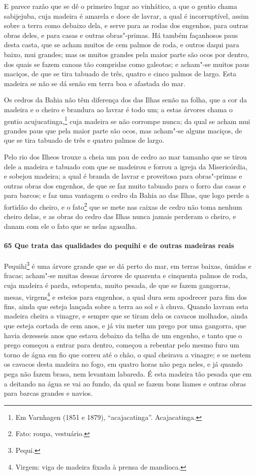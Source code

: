 \begin{linenumbers}
E parece razão que se dê o primeiro lugar ao vinhático, a que o gentio chama sabijejuba,
cuja madeira é amarela e doce de lavrar, a qual é incorruptível, assim sobre a terra como
debaixo dela, e serve para as rodas dos engenhos, para outras obras deles, e para casas e
outras obras"-primas. Há também façanhosos paus desta casta, que se acham muitos de cem
palmos de roda, e outros daqui para baixo, mui grandes; mas os muitos grandes pela maior
parte são ocos por dentro, dos quais se fazem canoas tão compridas
como galeotas; e acham"-se muitos paus maciços, de que se tira tabuado de três, quatro e
cinco palmos de largo. Esta madeira se não se dá senão em terra boa e afastada do mar.


Os cedros da Bahia não têm diferença dos das Ilhas senão na folha, que a cor da madeira e
o cheiro e brandura ao lavrar é todo um; a estas árvores chama o gentio
acujucatinga,\footnote{ Em Varnhagen (1851 e 1879), ``acajacatinga''. Acajacatinga.} cuja
madeira se não corrompe nunca; da qual se acham mui grandes paus que pela maior parte são
ocos, mas acham"-se alguns maciços, de que se tira tabuado de três e quatro palmos de
largo.

Pelo rio dos Ilheos trouxe a cheia um pau de cedro ao mar tamanho que se tirou dele a
madeira e tabuado com que se madeirou e forrou a igreja da Misericórdia, e sobejou
madeira; a qual é branda de lavrar e proveitosa para obras"-primas e outras obras dos
engenhos, de que se faz muito tabuado para o forro das casas e para barcos; e faz uma
vantagem o cedro da Bahia ao das Ilhas, que logo perde a fortidão do cheiro, e o
fato\footnote{ Fato: roupa, vestuário.} que se mete nas caixas de cedro não toma nenhum
cheiro delas, e as obras do cedro das Ilhas nunca jamais perderam o cheiro, e
danam com ele o fato que se nelas agasalha.

\paragraph{65 Que trata das qualidades do pequihi e de outras madeiras reais}\quad
Pequihi\footnote{ Pequi.} é uma árvore grande que se dá perto do mar, em terras baixas,
úmidas e fracas; acham"-se muitas dessas árvores de quarenta e cinquenta palmos de roda,
cuja madeira é parda, estopenta, muito pesada, de que se fazem gangorras, mesas,
virgens\footnote{ Virgem: viga de madeira fixada à prensa de mandioca.} e esteios para
engenhos, a qual dura sem apodrecer para fim dos fins, ainda que esteja lançada sobre a
terra ao sol e à chuva. Quando lavram esta madeira cheira a vinagre, e sempre que se tiram
dela os cavacos molhados, ainda que esteja cortada de cem anos, e já viu meter um prego
por uma gangorra, que havia dezesseis anos que estava debaixo da telha de um engenho, e
tanto que o prego começou a entrar para dentro, começou a rebentar pelo mesmo furo um
torno de água em fio que correu até o chão, o qual cheirava a vinagre; e se metem os
cavacos desta madeira no fogo, em quatro horas não pega neles, e já quando pega não fazem
brasa, nem levantam labareda. É esta madeira tão pesada que em a deitando na água se vai
ao fundo, da qual se fazem bons liames e outras obras para barcas grandes e navios.


\end{linenumbers}
